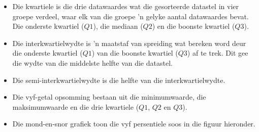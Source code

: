 \begin{itemize}[itemsep=6pt]
\item Die kwartiele is die drie datawaardes wat die gesorteerde datastel in vier groepe verdeel, waar elk van die groepe ’n gelyke aantal datawaardes bevat. Die onderste kwartiel ($Q1$), die mediaan ($Q2$) en die boonste kwartiel ($Q3$).

\item Die interkwartielwydte is ’n maatstaf van spreiding wat bereken word deur die onderste kwartiel ($Q1$) van die boonste kwartiel ($Q3$) af te trek. Dit gee die wydte van die middelste helfte van die datastel.

\item Die semi-interkwartielwydte is die helfte van die interkwartielwydte. 

\item Die vyf-getal opsomming bestaan uit die minimumwaarde, die maksimumwaarde en die drie kwartiele ($Q1$, $Q2$ en $Q3$). 

\item Die mond-en-snor grafiek toon die vyf persentiele soos in die figuur hieronder.
\end{itemize}

